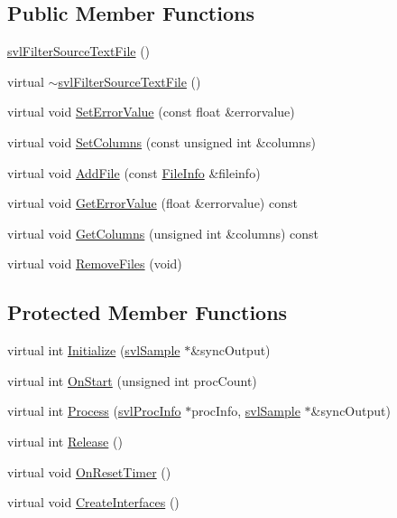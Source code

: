 \subsection*{Public Member Functions}
\begin{DoxyCompactItemize}
\item 
\hyperlink{classsvl_filter_source_text_file_ae6a465c8523126615515e33295cb404d}{svl\-Filter\-Source\-Text\-File} ()
\item 
virtual \hyperlink{classsvl_filter_source_text_file_ab66f6d821cfce047fade32d5124d615f}{$\sim$svl\-Filter\-Source\-Text\-File} ()
\item 
virtual void \hyperlink{classsvl_filter_source_text_file_a58288c125317f62fe8f5026310607686}{Set\-Error\-Value} (const float \&errorvalue)
\item 
virtual void \hyperlink{classsvl_filter_source_text_file_a246dfb8b5db76e32679f80e2117ede1d}{Set\-Columns} (const unsigned int \&columns)
\item 
virtual void \hyperlink{classsvl_filter_source_text_file_aa04f8bea964d554a300454e2c2075bff}{Add\-File} (const \hyperlink{classsvl_filter_source_text_file_a84944643e5cff813e434ffcdb29be62d}{File\-Info} \&fileinfo)
\item 
virtual void \hyperlink{classsvl_filter_source_text_file_a04b3ac29361a47d3578c5b19d7d9b2f8}{Get\-Error\-Value} (float \&errorvalue) const 
\item 
virtual void \hyperlink{classsvl_filter_source_text_file_ac81894e754267c000cf5dca9e8913962}{Get\-Columns} (unsigned int \&columns) const 
\item 
virtual void \hyperlink{classsvl_filter_source_text_file_ab04b1180aa30c88c2402da5207b6313f}{Remove\-Files} (void)
\end{DoxyCompactItemize}
\subsection*{Protected Member Functions}
\begin{DoxyCompactItemize}
\item 
virtual int \hyperlink{classsvl_filter_source_text_file_a0eb6a5bf42c5d687c55f19f1aad64558}{Initialize} (\hyperlink{classsvl_sample}{svl\-Sample} $\ast$\&sync\-Output)
\item 
virtual int \hyperlink{classsvl_filter_source_text_file_a559239205141af18d50c7d9b017c0aef}{On\-Start} (unsigned int proc\-Count)
\item 
virtual int \hyperlink{classsvl_filter_source_text_file_ad4137e136bfd165e7a104d90c2feff7d}{Process} (\hyperlink{structsvl_proc_info}{svl\-Proc\-Info} $\ast$proc\-Info, \hyperlink{classsvl_sample}{svl\-Sample} $\ast$\&sync\-Output)
\item 
virtual int \hyperlink{classsvl_filter_source_text_file_a14f0e0c625c773535a7731ff3ee25a6a}{Release} ()
\item 
virtual void \hyperlink{classsvl_filter_source_text_file_a52ce788e22214bd13c6311c51a5a1cd7}{On\-Reset\-Timer} ()
\item 
virtual void \hyperlink{classsvl_filter_source_text_file_afd08fbdaa1e1f2ec9da474734375358f}{Create\-Interfaces} ()
\end{DoxyCompactItemize}
